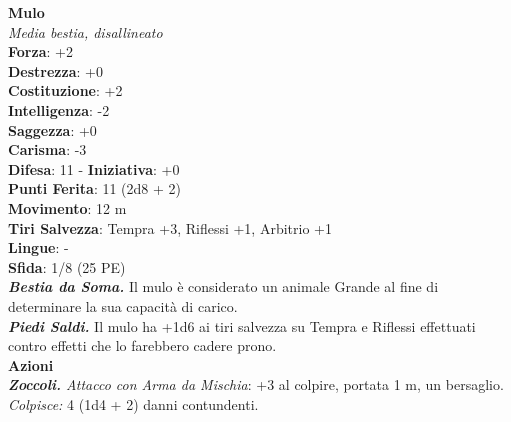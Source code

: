 \begin{multicols}{2}
\medskip\textbf{Mulo}\\
\emph{Media bestia, disallineato}\\
\textbf{Forza}: +2\\
\textbf{Destrezza}: +0\\
\textbf{Costituzione}: +2\\
\textbf{Intelligenza}: -2\\
\textbf{Saggezza}: +0\\
\textbf{Carisma}: -3\\
\textbf{Difesa}: 11 - \textbf{Iniziativa}: +0\\
\textbf{Punti Ferita}: 11 (2d8 + 2)\\
\textbf{Movimento}: 12 m\\
\textbf{Tiri Salvezza}: Tempra +3, Riflessi +1, Arbitrio +1 \\
\textbf{Lingue}: -\\
\textbf{Sfida}: 1/8 (25 PE)\smallskip\\
\emph{\textbf{Bestia da Soma.}} Il mulo è considerato un animale Grande al fine di determinare la sua capacità di carico.\\
\emph{\textbf{Piedi Saldi.}} Il mulo ha +1d6 ai tiri salvezza su Tempra e Riflessi effettuati contro effetti che lo farebbero cadere prono.\\
\smallskip\textbf{Azioni}\\
\emph{\textbf{Zoccoli.} Attacco con Arma da Mischia}: +3 al colpire, portata 1 m, un bersaglio.\\
\emph{Colpisce:} 4 (1d4 + 2) danni contundenti.\\



\end{multicols}
